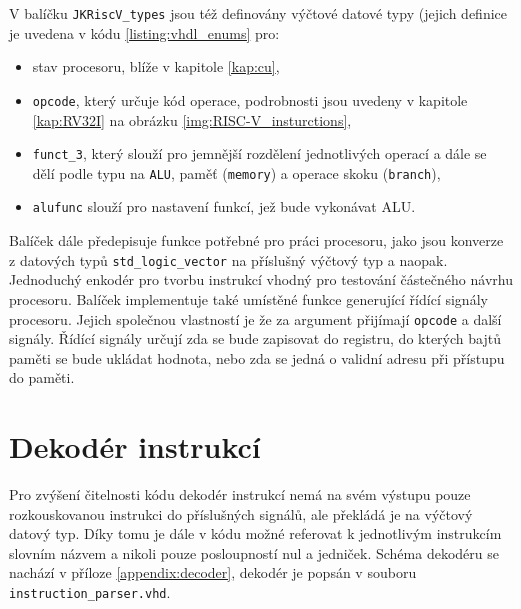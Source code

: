\documentclass[FM,BP]{tulthesis}
\begin{document}
V balíčku \verb|JKRiscV_types| jsou též definovány výčtové datové typy (jejich definice je uvedena v kódu \ref{listing:vhdl_enums} pro:
\begin{itemize}
    \item stav procesoru, blíže v kapitole \ref{kap:cu},
    \item \verb|opcode|, který určuje kód operace, podrobnosti jsou uvedeny v kapitole \ref{kap:RV32I} na obrázku \ref{img:RISC-V_insturctions},
    \item \verb|funct_3|, který slouží pro jemnější rozdělení jednotlivých operací a dále se dělí podle typu na \verb|ALU|, paměť (\verb|memory|) a operace skoku (\verb|branch|),
    \item \verb|alufunc| slouží pro nastavení funkcí, jež bude vykonávat ALU.
\end{itemize}

Balíček dále předepisuje funkce potřebné pro práci procesoru, jako jsou konverze z datových typů \verb|std_logic_vector| na příslušný výčtový typ a naopak. 
Jednoduchý enkodér pro tvorbu instrukcí vhodný pro testování částečného návrhu procesoru. Balíček implementuje také umístěné funkce generující řídící signály procesoru. Jejich společnou vlastností je že za argument přijímají \verb|opcode| a další signály. Řídící signály určují zda se bude zapisovat do registru, do kterých bajtů paměti se bude ukládat hodnota, nebo zda se jedná o validní adresu při přístupu do paměti. 


\section{Dekodér instrukcí} \label{kap:Dekodér instrukcí}
Pro zvýšení čitelnosti kódu dekodér instrukcí nemá na svém výstupu pouze rozkouskovanou instrukci do příslušných signálů, ale překládá je na výčtový datový typ. Díky tomu je dále v kódu možné referovat k jednotlivým instrukcím slovním názvem a nikoli pouze posloupností nul a jedniček. Schéma dekodéru se nachází v příloze \ref{appendix:decoder}, dekodér je popsán v souboru \verb|instruction_parser.vhd|.
\end{document}
